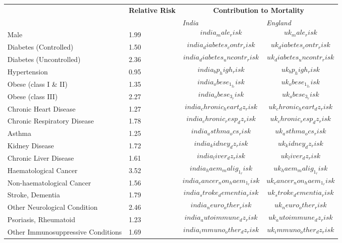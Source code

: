 \usepackage[a4paper,margin=1in,landscape]{geometry}

\begin{tabular}{p{6cm}p{1.5cm}p{2cm}p{2cm}}
& \textbf{Relative \newline Risk} & \multicolumn{2}{c}{\textbf{Contribution to Mortality}} \\[-1.5ex]
& & \emph{India} & \emph{England} \\[2ex]
Male & 1.99 & $$india_male_risk$$ & $$uk_male_risk$$ \\[0.25ex]
Diabetes (Controlled) & 1.50 & $$india_diabetes_contr_risk$$ & $$uk_diabetes_contr_risk$$ \\[0.25ex]
Diabetes (Uncontrolled) & 2.36 & $$india_diabetes_uncontr_risk$$ & $$uk_diabetes_uncontr_risk$$ \\[0.25ex]
Hypertension & 0.95 & $$india_bp_high_risk$$ & $$uk_bp_high_risk$$ \\[0.25ex]
Obese (class I \& II) & 1.35 & $$india_obese_1_2_risk$$ & $$uk_obese_1_2_risk$$ \\[0.25ex]
Obese (class III) & 2.27 & $$india_obese_3_risk$$ & $$uk_obese_3_risk$$ \\[0.25ex]
Chronic Heart Disease & 1.27 & $$india_chronic_heart_dz_risk$$ & $$uk_chronic_heart_dz_risk$$ \\[0.25ex]
Chronic Respiratory Disease & 1.78 & $$india_chronic_resp_dz_risk$$ & $$uk_chronic_resp_dz_risk$$ \\[0.25ex]
Asthma & 1.25 & $$india_asthma_ocs_risk$$ & $$uk_asthma_ocs_risk$$ \\[0.25ex]
Kidney Disease & 1.72 & $$india_kidney_dz_risk$$ & $$uk_kidney_dz_risk$$ \\[0.25ex]
Chronic Liver Disease & 1.61 & $$india_liver_dz_risk$$ & $$uk_liver_dz_risk$$ \\[0.25ex]
Haematological Cancer & 3.52 & $$india_haem_malig_1_risk$$ & $$uk_haem_malig_1_risk$$ \\[0.25ex]
Non-haematological Cancer & 1.56 & $$india_cancer_non_haem_1_risk$$ & $$uk_cancer_non_haem_1_risk$$ \\[0.25ex]
Stroke, Dementia & 1.79 & $$india_stroke_dementia_risk$$ & $$uk_stroke_dementia_risk$$ \\[0.25ex]
Other Neurological Condition & 2.46 & $$india_neuro_other_risk$$ & $$uk_neuro_other_risk$$ \\[0.25ex]
Psoriasis, Rheumatoid & 1.23 & $$india_autoimmune_dz_risk$$ & $$uk_autoimmune_dz_risk$$ \\[0.25ex]
Other Immunosuppressive Conditions & 1.69 & $$india_immuno_other_dz_risk$$ & $$uk_immuno_other_dz_risk$$ \\[0.25ex]
\end{tabular}

